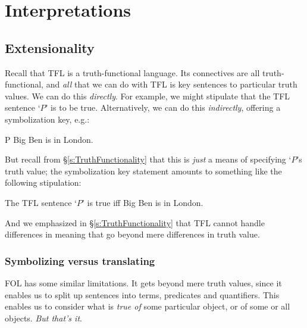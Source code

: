 \part{Interpretations}
\label{ch.semantics}


\chapter{Extensionality}\label{s:Interpretations}

Recall that TFL is a truth-functional language. Its connectives are all truth-functional, and \emph{all} that we can do with TFL is key sentences to particular truth values. We can do this \emph{directly}. For example, we might stipulate that the TFL sentence `$P$' is to be true. Alternatively, we can do this \emph{indirectly}, offering a symbolization key, e.g.:
	\begin{ekey}
		\item[P] Big Ben is in London.
	\end{ekey}
 But recall from \S\ref{s:TruthFunctionality} that this is \emph{just} a means of specifying `$P$'s truth value; the symbolization key statement amounts to something like the following stipulation: 
	\begin{ebullet}
		\item The TFL sentence `$P$' is true iff Big Ben is in London.
	\end{ebullet}
And we emphasized in \S\ref{s:TruthFunctionality} that TFL cannot handle differences in meaning that go beyond mere differences in truth value.

\section{Symbolizing versus translating}

FOL has some similar limitations. It gets beyond mere truth values, since it enables us to split up sentences into terms, predicates and quantifiers. This enables us to consider what is \emph{true of} some particular object, or of some or all objects. \emph{But that's it}.

